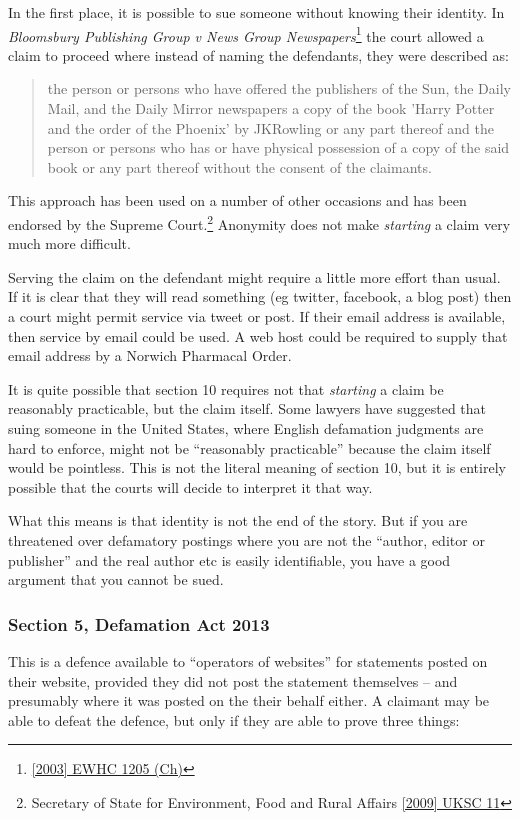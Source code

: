 \documentclass[]{article}
\begin{document}
In the first place, it is possible to sue someone without knowing their identity. In {\it Bloomsbury Publishing Group v News Group Newspapers}\footnote{\href{http://www.bailii.org/ew/cases/EWHC/Ch/2003/1205.html}{[2003] EWHC 1205 (Ch)}} the court allowed a claim to proceed where instead of naming the defendants, they were described as:

\begin{quote}
  the person or persons who have offered the publishers of the Sun, the Daily Mail, and the Daily Mirror newspapers a copy of the book 'Harry Potter and the order of the Phoenix' by JKRowling or any part thereof and the person or persons who has or have physical possession of a copy of the said book or any part thereof without the consent of the claimants.
\end{quote}

This approach has been used on a number of other occasions and has been endorsed by the Supreme Court.\footnote{Secretary of State for Environment, Food and Rural Affairs \href{http://www.bailii.org/uk/cases/UKSC/2009/11.html}{[2009] UKSC 11}} Anonymity does not make {\it starting} a claim very much more difficult. 

Serving the claim on the defendant might require a little more effort than usual. If it is clear that they will read something (eg twitter, facebook, a blog post) then a court might permit service via tweet or post. If their email address is available, then service by email could be used. A web host could be required to supply that email address by a Norwich Pharmacal Order.

It is quite possible that section 10 requires not that {\it starting} a claim be reasonably practicable, but the claim itself. Some lawyers have suggested that suing someone in the United States, where English defamation judgments are hard to enforce, might not be ``reasonably practicable'' because the claim itself would be pointless. This is not the literal meaning of section 10, but it is entirely possible that the courts will decide to interpret it that way.

What this means is that identity is not the end of the story. But if you are threatened over defamatory postings where you are not the ``author, editor or publisher'' and the real author etc is easily identifiable, you have a good argument that you cannot be sued.

\subsubsection{Section 5, Defamation Act 2013}
This is a defence available to ``operators of websites'' for statements posted on their website, provided they did not post the statement themselves -- and presumably where it was posted on the their behalf either. A claimant may be able to defeat the defence, but only if they are able to prove three things:
\end{document}
